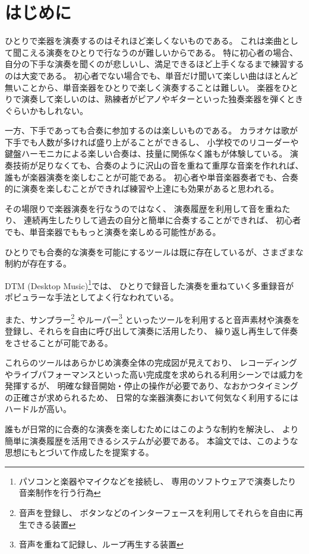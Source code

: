 %
%
\section{はじめに}
\label{sec:start}

ひとりで楽器を演奏するのはそれほど楽しくないものである。
これは楽曲として聞こえる演奏をひとりで行なうのが難しいからである。
特に初心者の場合、 自分の下手な演奏を聞くのが悲しいし、満足できるほど上手くなるまで練習するのは大変である。
初心者でない場合でも、単音だけ聞いて楽しい曲はほとんど無いことから、単音楽器をひとりで楽しく演奏することは難しい。
楽器をひとりで演奏して楽しいのは、熟練者がピアノやギターといった独奏楽器を弾くときぐらいかもしれない。

一方、下手であっても合奏に参加するのは楽しいものである。
カラオケは歌が下手でも人数が多ければ盛り上がることができるし、
小学校でのリコーダーや鍵盤ハーモニカによる楽しい合奏は、技量に関係なく誰もが体験している。
演奏技術が足りなくても、合奏のように沢山の音を重ねて重厚な音楽を作れれば、誰もが楽器演奏を楽しむことが可能である。
初心者や単音楽器奏者でも、合奏的に演奏を楽しむことができれば練習や上達にも効果があると思われる。

その場限りで楽器演奏を行なうのではなく、
演奏履歴を利用して音を重ねたり、
連続再生したりして過去の自分と簡単に合奏することができれば、
初心者でも、単音楽器でももっと演奏を楽しめる可能性がある。

ひとりでも合奏的な演奏を可能にするツールは既に存在しているが、さまざまな制約が存在する。

DTM (Desktop Music)\footnote{パソコンと楽器やマイクなどを接続し、
    専用のソフトウェアで演奏したり音楽制作を行う行為}では、
ひとりで録音した演奏を重ねていく多重録音が
ポピュラーな手法としてよく行なわれている\cite{jacob}\cite{resound}。


また、サンプラー\footnote{音声を登録し、
    ボタンなどのインターフェースを利用してそれらを自由に再生できる装置}
やルーパー\footnote{音声を重ねて記録し、ループ再生する装置}
といったツールを利用すると音声素材や演奏を登録し、それらを自由に呼び出して演奏に活用したり、
繰り返し再生して伴奏をさせることが可能である。

これらのツールはあらかじめ演奏全体の完成図が見えており、
レコーディングやライブパフォーマンスといった高い完成度を求められる利用シーンでは威力を発揮するが、
明確な録音開始・停止の操作が必要であり、なおかつタイミングの正確さが求められるため、
日常的な楽器演奏において何気なく利用するにはハードルが高い。

誰もが日常的に合奏的な演奏を楽しむためにはこのような制約を解決し、
より簡単に演奏履歴を活用できるシステムが必要である。
本論文では、このような思想にもとづいて作成した{\system}を提案する。
